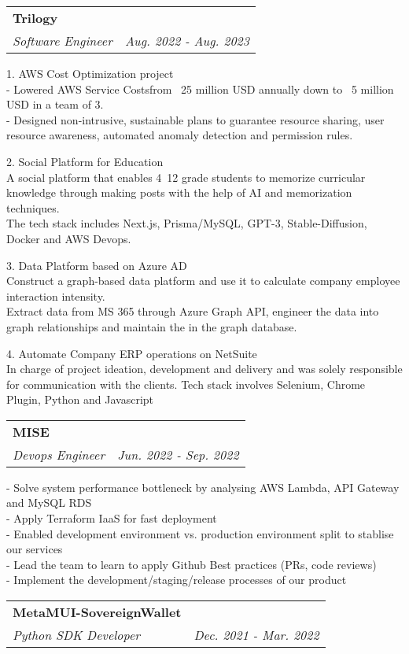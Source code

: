 \documentclass[letterpaper,11pt]{article}
\makeatletter
\renewenvironment{itemize}{
  \begin{list}{}{
    \setlength{\leftmargin}{0.6em}
    \setlength{\textwidth}{7.5in}
    \setlength{\topmargin}{-0.6in}
    \setlength{\textheight}{19.5in}
  }
}{
  \end{list}
}
\newcommand{\resitem}[1]{\item #1 \vspace{-2pt}}
\newcommand{\ressubheading}[4]{
\begin{tabular*}{6.5in}{l@{\extracolsep{\fill}}r}
		\textbf{#1} & #2 \\
		\textit{#3} & \textit{#4} \\
\end{tabular*}\vspace{-8.5pt}} %
\makeatother
\begin{document}
\begin{itemize}
	\ressubheading{Trilogy}{}{Software Engineer}{Aug. 2022 - Aug. 2023}
	\begin{itemize}
		\resitem{
1. AWS Cost Optimization project\\
- Lowered AWS Service Costsfrom ~25 million USD annually down to ~5 million USD in a team of 3. \\
- Designed non-intrusive, sustainable plans to guarantee resource sharing, user resource awareness, automated anomaly detection and permission rules. \\
		}
		\resitem{
2. Social Platform for Education\\
A social platform that enables 4~12 grade students to memorize curricular knowledge through making posts with the help of AI and memorization techniques.\\
The tech stack includes Next.js, Prisma/MySQL, GPT-3, Stable-Diffusion, Docker and AWS Devops.\\
		}
		\resitem{
3. Data Platform based on Azure AD\\
Construct a graph-based data platform and use it to calculate company employee interaction intensity.\\
Extract data from MS 365 through Azure Graph API, engineer the data into graph relationships and maintain the in the graph database.\\
		}
		\resitem{
4. Automate Company ERP operations on NetSuite\\
In charge of project ideation, development and delivery and was solely responsible for communication with the clients. Tech stack involves Selenium, Chrome Plugin, Python and Javascript\\
		}
	\end{itemize}
	\ressubheading{MISE}{}{Devops Engineer}{Jun. 2022 - Sep. 2022}
	\begin{itemize}
		\resitem{
			- Solve system performance bottleneck by analysing AWS Lambda, API Gateway and MySQL RDS \\
			- Apply Terraform IaaS for fast deployment \\
			- Enabled development environment vs. production environment split to stablise our services\\
			- Lead the team to learn to apply Github Best practices (PRs, code reviews) \\
			- Implement the development/staging/release processes of our product \\
			}
	\end{itemize}
	\ressubheading{MetaMUI-SovereignWallet}{}{Python SDK Developer}{Dec. 2021 - Mar. 2022}

\end{itemize}
\end{document}
